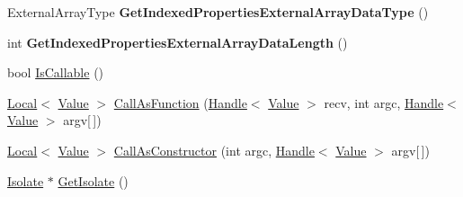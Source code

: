 \begin{DoxyCompactItemize}
\item 
\hypertarget{classv8_1_1Object_a02e0652188d3a9c557b07ac2ba037b23}{}External\+Array\+Type {\bfseries Get\+Indexed\+Properties\+External\+Array\+Data\+Type} ()\label{classv8_1_1Object_a02e0652188d3a9c557b07ac2ba037b23}

\item 
\hypertarget{classv8_1_1Object_a9aa725628f4d3371999663e6611efeb3}{}int {\bfseries Get\+Indexed\+Properties\+External\+Array\+Data\+Length} ()\label{classv8_1_1Object_a9aa725628f4d3371999663e6611efeb3}

\item 
bool \hyperlink{classv8_1_1Object_a23c2c1f23b50fab4a02e2f819641b865}{Is\+Callable} ()
\item 
\hyperlink{classv8_1_1Local}{Local}$<$ \hyperlink{classv8_1_1Value}{Value} $>$ \hyperlink{classv8_1_1Object_ac8dea845a715de7ad43fcb073dc8c3d9}{Call\+As\+Function} (\hyperlink{classv8_1_1Handle}{Handle}$<$ \hyperlink{classv8_1_1Value}{Value} $>$ recv, int argc, \hyperlink{classv8_1_1Handle}{Handle}$<$ \hyperlink{classv8_1_1Value}{Value} $>$ argv\mbox{[}$\,$\mbox{]})
\item 
\hyperlink{classv8_1_1Local}{Local}$<$ \hyperlink{classv8_1_1Value}{Value} $>$ \hyperlink{classv8_1_1Object_afeb999e9225dad0ca8605ed3015b268b}{Call\+As\+Constructor} (int argc, \hyperlink{classv8_1_1Handle}{Handle}$<$ \hyperlink{classv8_1_1Value}{Value} $>$ argv\mbox{[}$\,$\mbox{]})
\item 
\hyperlink{classv8_1_1Isolate}{Isolate} $\ast$ \hyperlink{classv8_1_1Object_ab991b53d50ab3ce53179e927e52b24f5}{Get\+Isolate} ()
\end{DoxyCompactItemize}
